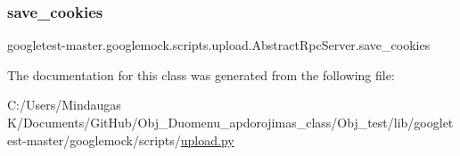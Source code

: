 \subsubsection{\texorpdfstring{save\_cookies}{save\_cookies}}
{\footnotesize\ttfamily googletest-\/master.\+googlemock.\+scripts.\+upload.\+Abstract\+Rpc\+Server.\+save\+\_\+cookies}



The documentation for this class was generated from the following file\+:\begin{DoxyCompactItemize}
\item 
C\+:/\+Users/\+Mindaugas K/\+Documents/\+Git\+Hub/\+Obj\+\_\+\+Duomenu\+\_\+apdorojimas\+\_\+class/\+Obj\+\_\+test/lib/googletest-\/master/googlemock/scripts/\mbox{\hyperlink{_obj__test_2lib_2googletest-master_2googlemock_2scripts_2upload_8py}{upload.\+py}}\end{DoxyCompactItemize}
